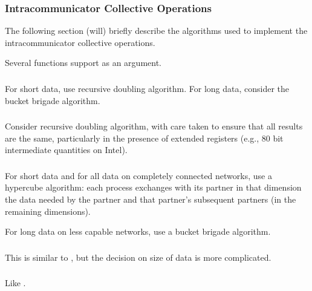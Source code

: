 \documentclass{article}
\begin{document}
\subsubsection{}


\subsubsection{Intracommunicator Collective Operations}
The following section (will) briefly describe the algorithms used to implement
the intracommunicator collective operations.

Several functions support  as an argument.

\subsubsection{}
For short data, use recursive doubling algorithm.  For long data, consider the
bucket brigade algorithm.

\subsubsection{}
Consider recursive doubling algorithm, with care taken to ensure that all
results are the same, particularly in the presence of extended registers
(e.g., 80 bit intermediate quantities on Intel).

\subsubsection{}
For short data and for all data on completely connected networks, use a
hypercube algorithm: each process exchanges with its partner in that dimension
the data needed by the partner and that partner's subsequent partners (in the
remaining dimensions).

For long data on less capable networks, use a bucket brigade algorithm.

\subsubsection{}
This is similar to , but the decision on size of data is
more complicated.  

\subsubsection{}
Like .
\end{document}
